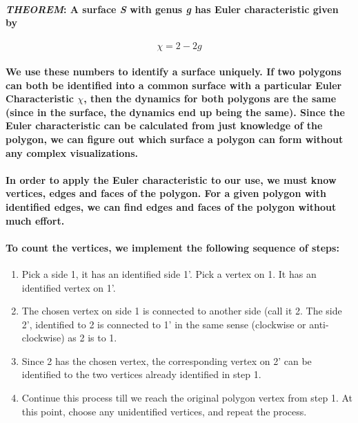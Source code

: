 \documentclass{article}
\begin{document}
\paragraph{\textit{THEOREM}: A surface \textit{S} with genus \textit{g} has Euler characteristic given by}

\begin{equation}
\chi=2-2g
\end{equation}

\paragraph{We use these numbers to identify a surface uniquely. If two polygons can both be identified into a common surface with a particular Euler Characteristic $\chi$, then the dynamics for both polygons are the same (since in the surface, the dynamics end up being the same). Since the Euler characteristic can be calculated from just knowledge of the polygon, we can figure out which surface a polygon can form without any complex visualizations.}

\paragraph{In order to apply the Euler characteristic to our use, we must know vertices, edges and faces of the polygon. For a given polygon with identified edges, we can find edges and faces of the polygon without much effort.}

\paragraph{To count the vertices, we implement the following sequence of steps:}


\begin{enumerate}

\item Pick a side 1, it has an identified side 1’. Pick a vertex on 1. It has an identified vertex on 1’.

\item The chosen vertex on side 1 is connected to another side (call it 2. The side 2’, identified to 2 is connected to 1’ in the same sense (clockwise or anti-clockwise) as 2 is to 1.

\item Since 2 has the chosen vertex, the corresponding vertex on 2’ can be identified to the two vertices already identified in step 1.

\item Continue this process till we reach the original polygon vertex from step 1. At this point, choose any unidentified vertices, and repeat the process.

\end{enumerate}
\end{document}

